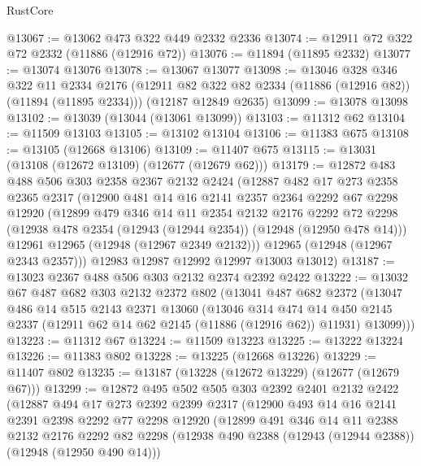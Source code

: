 \begin{lexlean}{RustCore}
\begin{coremodule}
@13067 := @13062 @473 @322 @449 @2332 @2336
@13074 := @12911 @72 @322 @72 @2332 (@11886 (@12916 @72))
@13076 := @11894 (@11895 @2332)
@13077 := @13074 @13076
@13078 := @13067 @13077
@13098 := @13046
    @328
    @346
    @322
    @11
    @2334
    @2176
    (@12911 @82 @322 @82 @2334 (@11886 (@12916 @82)) (@11894 (@11895 @2334)))
    (@12187 @12849 @2635)
@13099 := @13078 @13098
@13102 := @13039 (@13044 (@13061 @13099))
@13103 := @11312 @62
@13104 := @11509 @13103
@13105 := @13102 @13104
@13106 := @11383 @675
@13108 := @13105 (@12668 @13106)
@13109 := @11407 @675
@13115 := @13031 (@13108 (@12672 @13109) (@12677 (@12679 @62)))
@13179 := @12872
    @483
    @488
    @506
    @303
    @2358
    @2367
    @2132
    @2424
    (@12887
      @482
      @17
      @273
      @2358
      @2365
      @2317
      (@12900
        @481
        @14
        @16
        @2141
        @2357
        @2364
        @2292
        @67
        @2298
        @12920
        (@12899
          @479
          @346
          @14
          @11
          @2354
          @2132
          @2176
          @2292
          @72
          @2298
          (@12938 @478 @2354 (@12943 (@12944 @2354)) (@12948 (@12950 @478 @14)))
          @12961
          @12965
          (@12948 (@12967 @2349 @2132)))
        @12965
        (@12948 (@12967 @2343 @2357)))
      @12983
      @12987
      @12992
      @12997
      @13003
      @13012)
@13187 := @13023 @2367 @488 @506 @303 @2132 @2374 @2392 @2422
@13222 := @13032
    @67
    @487
    @682
    @303
    @2132
    @2372
    @802
    (@13041
      @487
      @682
      @2372
      (@13047
        @486
        @14
        @515
        @2143
        @2371
        @13060
        (@13046
          @314
          @474
          @14
          @450
          @2145
          @2337
          (@12911 @62 @14 @62 @2145 (@11886 (@12916 @62)) @11931)
          @13099)))
@13223 := @11312 @67
@13224 := @11509 @13223
@13225 := @13222 @13224
@13226 := @11383 @802
@13228 := @13225 (@12668 @13226)
@13229 := @11407 @802
@13235 := @13187 (@13228 (@12672 @13229) (@12677 (@12679 @67)))
@13299 := @12872
    @495
    @502
    @505
    @303
    @2392
    @2401
    @2132
    @2422
    (@12887
      @494
      @17
      @273
      @2392
      @2399
      @2317
      (@12900
        @493
        @14
        @16
        @2141
        @2391
        @2398
        @2292
        @77
        @2298
        @12920
        (@12899
          @491
          @346
          @14
          @11
          @2388
          @2132
          @2176
          @2292
          @82
          @2298
          (@12938 @490 @2388 (@12943 (@12944 @2388)) (@12948 (@12950 @490 @14)))

\end{coremodule}
\end{lexlean}
